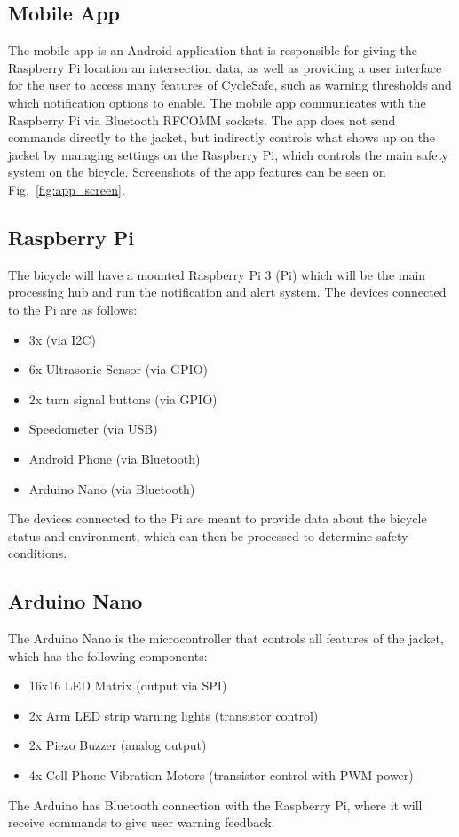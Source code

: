 \documentclass[journal]{IEEEtran}
\begin{document}
\subsection{Mobile App}
The mobile app is an Android application that is responsible for giving the Raspberry Pi location an intersection data, as well as providing a user interface for the user to access many features of CycleSafe, such as warning thresholds and which notification options to enable. The mobile app communicates with the Raspberry Pi via Bluetooth RFCOMM sockets. The app does not send commands directly to the jacket, but indirectly controls what shows up on the jacket by managing settings on the Raspberry Pi, which controls the main safety system on the bicycle. Screenshots of the app features can be seen on Fig.~\ref{fig:app_screen}.

\subsection{Raspberry Pi}
The bicycle will have a mounted Raspberry Pi 3 (Pi) which will be the main processing hub and run the notification and alert system. The devices connected to the Pi are as follows:
\begin{itemize}
    \item 3x \lidar{} (via I2C)
    \item 6x Ultrasonic Sensor \sonar{} (via GPIO)
    \item 2x turn signal buttons (via GPIO)
    \item Speedometer (via USB)
    \item Android Phone (via Bluetooth)
    \item Arduino Nano (via Bluetooth)
\end{itemize}
The devices connected to the Pi are meant to provide data about the bicycle status and environment, which can then be processed to determine safety conditions.

\subsection{Arduino Nano}
The Arduino Nano is the microcontroller that controls all features of the jacket, which has the following components:
\begin{itemize}
    \item 16x16 LED Matrix (output via SPI)
    \item 2x Arm LED strip warning lights (transistor control)
    \item 2x Piezo Buzzer (analog output)
    \item 4x Cell Phone Vibration Motors (transistor control with PWM power)
\end{itemize}
The Arduino has Bluetooth connection with the Raspberry Pi, where it will receive commands to give user warning feedback.
\end{document}
